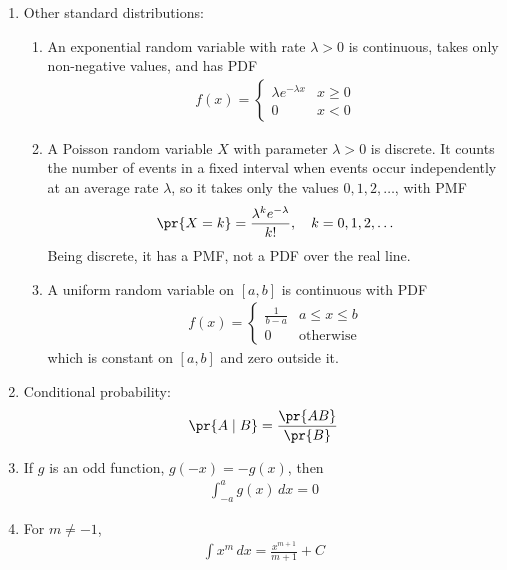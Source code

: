 \begin{enumerate}[label=\thesubsection.\arabic*, ref=\thesubsection.\theenumi]
\item Other standard distributions:
\begin{enumerate}[label=\alph*)]
\item An exponential random variable with rate $\lambda > 0$ is continuous,
takes only non-negative values, and has PDF
\begin{align}
f(x) =
\begin{cases}
\lambda e^{-\lambda x} & x \ge 0 \\
0 & x < 0
\end{cases}
\label{eq:exp-pdf}
\end{align}
\item A Poisson random variable $X$ with parameter $\lambda > 0$ is
discrete. It counts the number of events in a fixed interval when events
occur independently at an average rate $\lambda$, so it takes only the
values $0, 1, 2, \dots$, with PMF
\begin{align}
\pr{X = k} = \frac{\lambda^{k} e^{-\lambda}}{k!}, \quad k = 0, 1, 2, \dots
\label{eq:poisson-pmf}
\end{align}
Being discrete, it has a PMF, not a PDF over the real line.
\item A uniform random variable on $[a, b]$ is continuous with PDF
\begin{align}
f(x) =
\begin{cases}
\frac{1}{b - a} & a \le x \le b \\
0 & \text{otherwise}
\end{cases}
\label{eq:unif-pdf}
\end{align}
which is constant on $[a, b]$ and zero outside it.
\end{enumerate}

\item Conditional probability:
\begin{align}
\pr{A \mid B} = \frac{\pr{AB}}{\pr{B}}
\label{eq:cond-prob}
\end{align}

\item If $g$ is an odd function, $g(-x) = -g(x)$, then
\begin{align}
\int_{-a}^{a} g(x)\, dx = 0
\label{eq:odd-int}
\end{align}

\item For $m \neq -1$,
\begin{align}
\int x^{m}\, dx = \frac{x^{m+1}}{m+1} + C
\label{eq:power-rule}
\end{align}


\end{enumerate}
